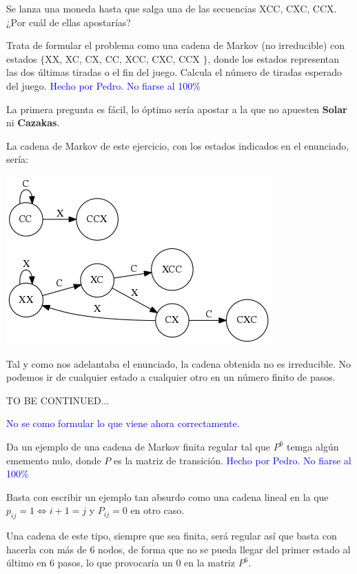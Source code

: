 \begin{problem}[11]
 Se lanza una moneda hasta que salga una de las secuencias XCC, CXC, CCX. ¿Por
cuál de ellas apostarías?

 Trata de formular el problema como una cadena de Markov (no irreducible) con estados $\{$XX, XC, CX, CC, XCC, CXC, CCX $\}$, donde los estados representan
las dos últimas tiradas o el fin del juego. Calcula el número de tiradas esperado del juego.
	\solution
	\textcolor{blue}{Hecho por Pedro. No fiarse al 100\%}

	La primera pregunta es fácil, lo óptimo sería apostar a la que no apuesten \textbf{Solar} ni \textbf{Cazakas}.

	La cadena de Markov de este ejercicio, con los estados indicados en el enunciado, sería:
	\begin{center}
	\includegraphics{tex/grafo_H2E11.png}
	\end{center}

	Tal y como nos adelantaba el enunciado, la cadena obtenida no es irreducible. No podemos ir de cualquier estado a cualquier otro en un número finito de pasos.

	TO BE CONTINUED...

	\textcolor{blue}{No se como formular lo que viene ahora correctamente.}

\end{problem}

\begin{problem}[12]
	Da un ejemplo de una cadena de Markov finita regular tal que $P^6$ temga algún ememento nulo, donde $P$ es la matriz de transición.
	\solution
	\textcolor{blue}{Hecho por Pedro. No fiarse al 100\%}

	Basta con escribir un ejemplo tan absurdo como una cadena lineal en la que $p_{ij}=1 \iff i+1=j$ y $P_{ij}=0$ en otro caso.

	Una cadena de este tipo, siempre que sea finita, será regular así que basta con hacerla con más de 6 nodos, de forma que no se pueda llegar del primer estado al último en 6 pasos, lo que provocaría un 0 en la matriz $P^6$.
\end{problem}

